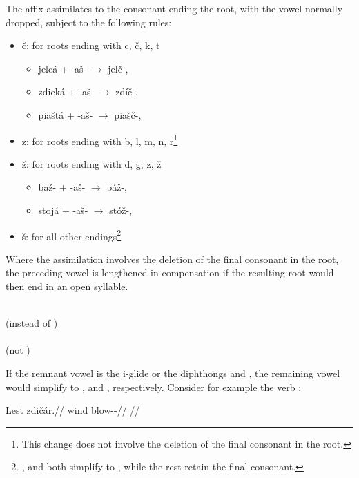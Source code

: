 The affix  assimilates to the consonant ending the root, with the vowel  normally dropped, subject to the following rules:
\begin{itemize}
	\item č: for roots ending with c, č, k, t
	\begin{itemize}
		\item jelcá + -aš- $\rightarrow$ jelč-, 
		\item zdieká + -aš- $\rightarrow$ zdíč-, 
		\item piaštá + -aš- $\rightarrow$ piašč-, 
	\end{itemize}
	\item z: for roots ending with b, l, m, n, r\footnote{This change does not involve the deletion of the final consonant in the root.}
	\item ž: for roots ending with d, g, z, ž
	\begin{itemize}
		\item baž- + -aš- $\rightarrow$ báž-, 
		\item stojá + -aš- $\rightarrow$ stóž-, 
	\end{itemize}
	\item š: for all other endings\footnote{ ,  and  both simplify to , while the rest retain the final consonant.}
\end{itemize}

Where the assimilation involves the deletion of the final consonant in the root, the preceding vowel is lengthened in compensation if the resulting root would then end in an open syllable.
\begin{multicols}{2}
\pex
{}\\
(instead of )\\
\xe
\pex
{}\\
(not )\\
\xe
\end{multicols}

If the remnant vowel is the i-glide  or the diphthongs  and , the remaining vowel would simplify to ,  and , respectively. Consider for example the verb  :

\pex
\begingl
\gla Lest zdič\'ar.//
\glb wind blow-\Av{}-\Prog{}//
\glft {}//
\endgl
\xe

